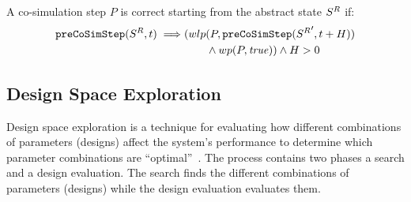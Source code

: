 \begin{definition}\label{def:correctalgo}
  A co-simulation step $P$ is correct starting from the abstract state $S^{R}_{}$ if:
  \begin{align}
    \mathtt{preCoSimStep}(S^{R}_{}, t) \implies &(wlp(P,\mathtt{preCoSimStep}({S^{R}_{}}', t+H)) \nonumber \\ 
    &\qquad \land wp(P, \mathit{true})) \land H > 0 \nonumber
  \end{align}
\end{definition}

\subsection{Design Space Exploration}
Design space exploration is a technique for evaluating how different combinations of parameters (designs) affect the system's performance to determine which parameter combinations are ``optimal''~\cite{kang_approach_2011}.
The process contains two phases a search and a design evaluation.
The search finds the different combinations of parameters (designs) while the design evaluation evaluates them.